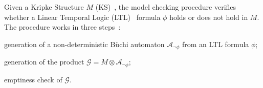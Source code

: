 Given a Kripke Structure $M$ (KS)~\cite{Kripke1963-KRISCO}, the model checking procedure verifies whether a Linear Temporal Logic (LTL)~\cite{pnueli1977temporal} formula $\phi$ holds or does not hold in $M$. 
The procedure works in three steps~\cite{clarke1999model}:
\begin{enumerate*}
\item generation of a non-deterministic B{\"u}chi automaton $\mathcal{A}_{\lnot\phi}$ from an LTL formula $\phi$;
\item generation of the product $\mathcal{G}=M \otimes\mathcal{A}_{\lnot\phi}$;
\item emptiness check of $\mathcal{G}$.
\end{enumerate*}



